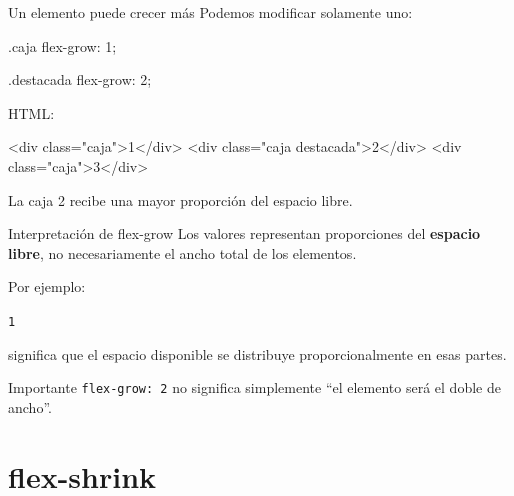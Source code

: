 \documentclass[aspectratio=169,11.5pt]{beamer}
\begin{document}
    \begin{frame}[fragile]{Un elemento puede crecer más}
        Podemos modificar solamente uno:

        \begin{csscodedark}
            .caja {
                flex-grow: 1;
            }

            .destacada {
                flex-grow: 2;
            }
        \end{csscodedark}

        HTML:

        \begin{htmlcodedark}
            <div class="caja">1</div>
            <div class="caja destacada">2</div>
            <div class="caja">3</div>
        \end{htmlcodedark}

        La caja 2 recibe una mayor proporción
        del espacio libre.
    \end{frame}

    \begin{frame}{Interpretación de flex-grow}
        Los valores representan proporciones
        del \textbf{espacio libre}, no necesariamente
        el ancho total de los elementos.

        Por ejemplo:

        \begin{center}
            \texttt{1  }
        \end{center}

        significa que el espacio disponible
        se distribuye proporcionalmente
        en esas partes.

        \begin{alertblock}{Importante}
            \texttt{flex-grow: 2} no significa simplemente
            ``el elemento será el doble de ancho''.
        \end{alertblock}
    \end{frame}



    \section{flex-shrink}
\end{document}
